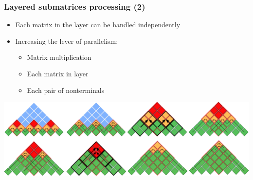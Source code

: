 \documentclass[xcolor=table]{beamer}
\begin{document}
\begin{frame}[fragile] \frametitle{Layered submatrices processing (2)}

    \begin{itemize}
    \item Each matrix in the layer can be handled independently
    \item Increasing the lever of parallelism: 
    \begin{itemize}
        \item Matrix multiplication 
        \item Each matrix in layer
        \item Each pair of nonterminals
    \end{itemize}
    \end{itemize}

        \begin{center}
        \includegraphics[width=.90\textwidth]{pic/modivis_again.pdf} 
        \end{center} 
    
\end{frame}
\end{document}

